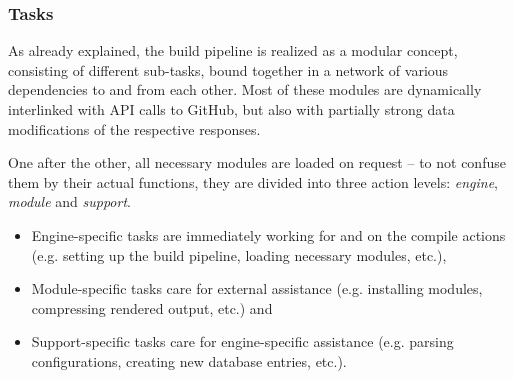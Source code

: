 \subsubsection{Tasks}
As already explained, the build pipeline is realized as a modular concept, consisting of different sub-tasks, bound together in a network of various dependencies to and from each other. Most of these modules are dynamically interlinked with API calls to GitHub, but also with partially strong data modifications of the respective responses.

One after the other, all necessary modules are loaded on request -- to not confuse them by their actual functions, they are divided into three action levels: \emph{engine}, \emph{module} and \emph{support}.

\begin{itemize}
  \item Engine-specific tasks are immediately working for and on the compile actions (e.g. setting up the build pipeline, loading necessary modules, etc.),
  \item Module-specific tasks care for external assistance (e.g. installing modules, compressing rendered output, etc.) and
  \item Support-specific tasks care for engine-specific assistance (e.g. parsing configurations, creating new database entries, etc.).
\end{itemize}
